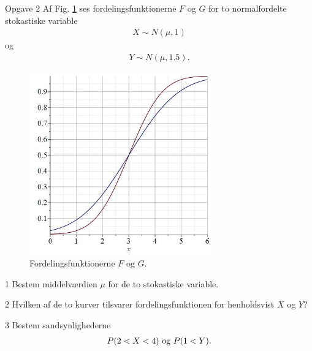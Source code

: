 \begin{opgavetekst}{Opgave 2}
	Af Fig. \ref{fig:fordeling} ses fordelingsfunktionerne $F$ og $G$ for to normalfordelte stokastiske variable
	\begin{align*}
		X \sim N(\mu,1)
	\end{align*}
	og 
	\begin{align*}
		Y \sim N(\mu,1.5).
	\end{align*}
	\begin{figure}[H]
		\centering
		\includegraphics[width=0.7\textwidth]{Billeder/fordelingafl.jpg}
		\caption{Fordelingsfunktionerne $F$ og $G$.}
		\label{fig:fordeling}
	\end{figure}
	\phantom{h}
\end{opgavetekst}
	\begin{delopgave}{}{1}
		Bestem middelværdien $\mu$ for de to stokastiske variable.
	\end{delopgave}
	\begin{delopgave}{}{2}
		Hvilken af de to kurver tilsvarer fordelingsfunktionen for henholdsvist $X$ og $Y$?
	\end{delopgave}
	\begin{delopgave}{}{3}
		Bestem sandsynlighederne
		\begin{align*}
			P(2<X<4) \textnormal{ og } P(1<Y).
		\end{align*}
	\end{delopgave}

